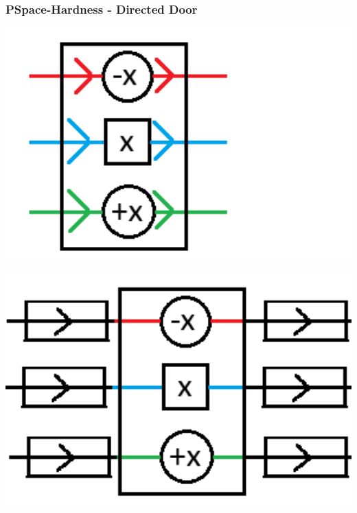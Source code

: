 \documentclass{beamer}
\begin{document}
\begin{frame}
  \frametitle{PSpace-Hardness - Directed Door}
  \begin{minipage}[t]{0.49\textwidth}
    \includegraphics[width=1\textwidth]{res/DirectedNormal.png}
  \end{minipage}
  \begin{minipage}[t]{0.49\textwidth}
    \includegraphics[width=1\textwidth]{res/DirectedSim.png}
  \end{minipage}
\end{frame}
\end{document}

